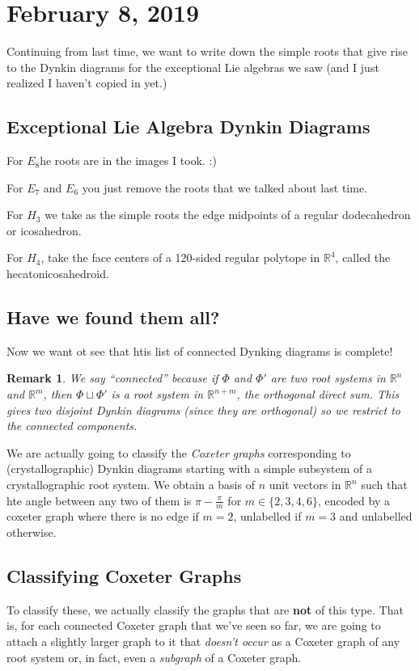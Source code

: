 \documentclass[12pt]{article}
\theoremstyle{nonumberbreak}
\theoremstyle{changebreak}
\theoremstyle{nonumberbreak}
\theoremstyle{change}
\newtheorem{rmk}[thm]{Remark}
\newcommand*{\R}{
\mathbb{R}
}
\begin{document}
\section{February 8, 2019}
Continuing from last time, we want to write down the simple roots that give rise to the Dynkin diagrams 
for the exceptional Lie algebras we saw (and I just realized I haven't copied in yet.)

\subsection{Exceptional Lie Algebra Dynkin Diagrams}
For $E_8$he roots are in the images I took. :)

For $E_7$ and $E_6$ you just remove the roots that we talked about last time.

For $H_3$ we take as the simple roots the edge midpoints of a regular dodecahedron or icosahedron.

For $H_4$, take the face centers of a 120-sided regular polytope in $\R^4$, called the hecatonicosahedroid. 

\subsection{Have we found them all?}
Now we want ot see that htis list of connected Dynking diagrams is complete! 
\begin{rmk}
	We say ``connected'' because if $\Phi$ and $\Phi'$ are two root systems in $\R^n$ and $\R^m$,
	then $\Phi\sqcup\Phi'$ is a root system in $\R^{n+m}$, the orthogonal direct sum. This gives two disjoint
	Dynkin diagrams (since they are orthogonal) so we restrict to the connected components.
\end{rmk}

We are actually going to classify the \textit{Coxeter graphs} corresponding to (crystallographic) Dynkin diagrams
starting with a simple subsystem of a crystallographic root system. We obtain a basis of $n$ unit vectors in $\R^n$ such that hte angle between any 
two of them is $\pi-\frac{\pi}{m}$ for $m\in\{2,3,4,6\}$, encoded by a coxeter graph where there is no edge if $m=2$, unlabelled if $m=3$ and unlabelled otherwise.

\subsection{Classifying Coxeter Graphs}
To classify these, we actually classify the graphs that are \textbf{not} of this type. That is, for each connected Coxeter graph
that we've seen so far, we are going to attach a slightly larger graph to it that \textit{doesn't occur} as a Coxeter graph of any root system
or, in fact, even a \textit{subgraph} of a Coxeter graph.
\end{document}
